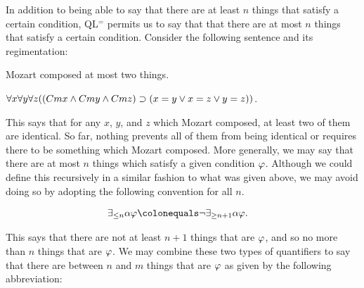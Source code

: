 In addition to being able to say that there are at least $n$ things that satisfy a certain condition, QL$^=$ permits us to say that that there are at most $n$ things that satisfy a certain condition. 
Consider the following sentence and its regimentation:

\begin{earg}
  \item[\ex{Q3}] Mozart composed at most two things.
  \item[\ex{Q4}] $\forall x\forall y\forall z((Cmx \wedge Cmy \wedge Cmz) \supset (x = y \vee x = z \vee y = z))$.
\end{earg}

This says that for any $x$, $y$, and $z$ which Mozart composed, at least two of them are identical. 
So far, nothing prevents all of them from being identical or requires there to be something which Mozart composed. 
%
%
More generally, we may say that there are at most $n$ things which satisfy a given condition $\varphi$.
Although we could define this recursively in a similar fashion to what was given above, we may avoid doing so by adopting the following convention for all $n$.

\vspace{-.2in}
\begin{align*}
  \qt{\exists_{\leq n}}{\alpha}\metaA &\colonequals \neg\qt{\exists_{\geq n+1}}{\alpha}\metaA.
\end{align*}
\vspace{-.2in}

This says that there are not at least $n+1$ things that are $\varphi$, and so no more than $n$ things that are $\varphi$. 
We may combine these two types of quantifiers to say that there are between $n$ and $m$ things that are $\varphi$ as given by the following abbreviation: 

